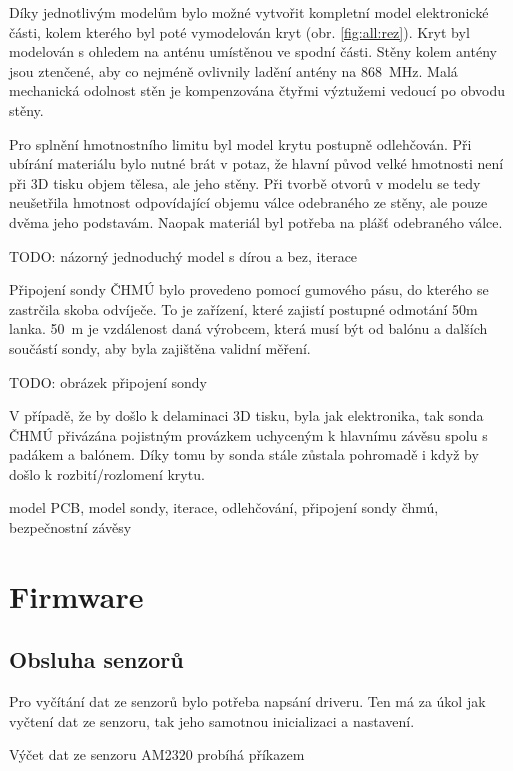 \documentclass[twoside]{ctuthesis}
\theoremstyle{plain}
\theoremstyle{definition}
\theoremstyle{note}
\begin{document}
	
	Díky jednotlivým modelům bylo možné vytvořit kompletní model elektronické části, kolem kterého byl poté vymodelován kryt (obr. \ref{fig:all:rez}). Kryt byl modelován s ohledem na anténu umístěnou ve spodní části. Stěny kolem antény jsou ztenčené, aby co nejméně ovlivnily ladění antény na 868~MHz. Malá mechanická odolnost stěn je kompenzována čtyřmi výztužemi vedoucí po obvodu stěny.

	Pro splnění hmotnostního limitu byl model krytu postupně odlehčován. Při ubírání materiálu bylo nutné brát v potaz, že hlavní původ velké hmotnosti není při 3D tisku objem tělesa, ale jeho stěny. Při tvorbě otvorů v modelu se tedy neušetřila hmotnost odpovídající objemu válce odebraného ze stěny, ale pouze dvěma jeho podstavám. Naopak materiál byl potřeba na plášť odebraného válce.

	TODO: názorný jednoduchý model s dírou a bez, iterace 

	Připojení sondy ČHMÚ bylo provedeno pomocí gumového pásu, do kterého se zastrčila skoba odvíječe. To je zařízení, které zajistí postupné odmotání 50m lanka. 50~m je vzdálenost daná výrobcem, která musí být od balónu a dalších součástí sondy, aby byla zajištěna validní měření.

	TODO: obrázek připojení sondy

	V případě, že by došlo k delaminaci 3D tisku, byla jak elektronika, tak sonda ČHMÚ přivázána pojistným provázkem uchyceným k hlavnímu závěsu spolu s padákem a balónem. Díky tomu by sonda stále zůstala pohromadě i když by došlo k rozbití/rozlomení krytu.

	model PCB, model sondy, iterace, odlehčování, připojení sondy čhmú, bezpečnostní závěsy










	\section{Firmware}
	
	\subsection{Obsluha senzorů}
	Pro vyčítání dat ze senzorů bylo potřeba napsání driveru. Ten má za úkol jak vyčtení dat ze senzoru, tak jeho samotnou inicializaci a nastavení. 

	Výčet dat ze senzoru AM2320 probíhá příkazem
	
\end{document}
